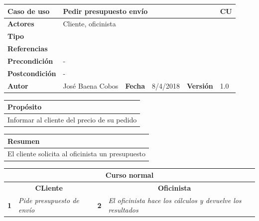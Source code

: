 \documentclass[12pt,spanish]{article}
\begin{document}
\begin{table}[H]
	\centering
	\begin{tabular}{|m{3cm}|m{4cm}|m{2cm}|m{2cm}|m{2cm}|m{1cm}|}
		\hline
		\textbf{Caso de uso} &  \multicolumn{4}{m{11cm}|}{Pedir presupuesto envío} \vline &  \cellcolor{gray!40}CU\arabic{contadorCU}  \stepcounter{contadorCU} \\
		\hline
		\textbf{Actores} & \multicolumn{5}{m{11cm}|}{Cliente, oficinista} \\
		\hline
		\textbf{Tipo} & \multicolumn{5}{m{11cm}|}{} \\
		\hline
		\textbf{Referencias} &\multicolumn{5}{m{11cm}|}{} \\
		\hline
		\textbf{Precondición} & \multicolumn{5}{m{11cm}|}{-} \\
		\hline
		\textbf{Postcondición} & \multicolumn{5}{m{11cm}|}{-} \\
		\hline
		\textbf{Autor} & José Baena Cobos & \textbf{Fecha} & 8/4/2018 & \textbf{Versión} & 1.0 \\
		\hline
	\end{tabular}
	
	\vspace{1cm}
	
	\begin{tabular}{|m{16.2cm}|}
		\hline
		\textbf{Propósito} \\
		\hline
		Informar al cliente del precio de su pedido\\
		\hline
	\end{tabular}
	
	\vspace{1cm}
	
	\begin{tabular}{|m{16.2cm}|}
		\hline
		\textbf{Resumen} \\
		\hline
		El cliente solicita al oficinista un presupuesto\\
		\hline
	\end{tabular}
	
	\vspace{1cm}
	
	\begin{tabular}{|m{5pt}|m{7.33cm}|m{5pt}|m{7.33cm}|}
		\hline
		\multicolumn{4}{|c|}{\textbf{Curso normal}} \\
		\hline
		\multicolumn{2}{|c}{\textbf{CLiente}} & \multicolumn{2}{|c|}{\textbf{Oficinista}} \\
		\hline
		\textbf{1} & \textit{Pide presupuesto de envío} & \textbf{2} & \textit{El oficinista hace los cálculos y devuelve los resultados} \\
		\hline
	

\end{tabular}
\end{table}
\end{document}
